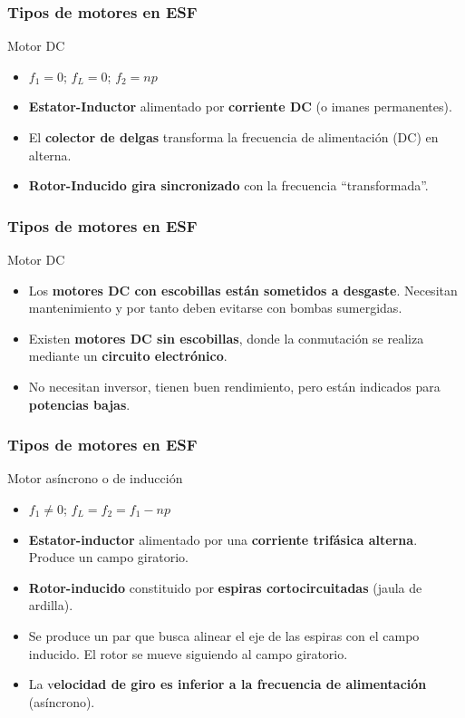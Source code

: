 \documentclass[serif, xcolor=dvipsnames]{beamer}
\begin{document}
\begin{frame}
\frametitle{Tipos de motores en ESF}
\begin{block}
{Motor DC}
\begin{itemize}
\item $f_{1}=0$; $f_{L}=0$;\textrm{ $f_{2}=np$}
\item \textbf{Estator-Inductor} alimentado por \textbf{corriente DC} (o
imanes permanentes). 
\item El \textbf{colector de delgas} transforma la frecuencia de alimentación
(DC) en alterna.
\item \textbf{Rotor-Inducido gira sincronizado} con la frecuencia {}``transformada''.
\end{itemize}
\end{block}

\end{frame}

\begin{frame}
\frametitle{Tipos de motores en ESF}
\begin{block}
{Motor DC}
\begin{itemize}
\item Los \textbf{motores DC con escobillas están sometidos a desgaste}.
Necesitan mantenimiento y por tanto deben evitarse con bombas sumergidas. 
\item Existen \textbf{motores DC sin escobillas}, donde la conmutación se
realiza mediante un \textbf{circuito electrónico}.
\item No necesitan inversor, tienen buen rendimiento, pero están indicados
para \textbf{potencias bajas}.
\end{itemize}
\end{block}

\end{frame}

\begin{frame}
\frametitle{Tipos de motores en ESF}
\begin{block}
{Motor asíncrono o de inducción}
\begin{itemize}
\item $f_{1}\neq0$; \textrm{$f_{L}=f_{2}=f_{1}-np$}
\item \textbf{Estator-inductor} alimentado por una \textbf{corriente trifásica
alterna}. Produce un campo giratorio.
\item \textbf{Rotor-inducido} constituido por \textbf{espiras cortocircuitadas}
(jaula de ardilla). 
\item Se produce un par que busca alinear el eje de las espiras con el campo
inducido. El rotor se mueve siguiendo al campo giratorio.
\item La v\textbf{elocidad de giro es inferior a la frecuencia de alimentación}
(asíncrono). 
\end{itemize}
\end{block}

\end{frame}
\end{document}
